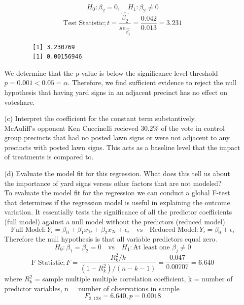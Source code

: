 \documentclass[12pt,letterpaper]{article}
\begin{document}
\begin{enumerate}
	
		\begin{equation*}
		H_0: \beta_2 = 0, \quad H_1: \beta_2 \ne 0
	\end{equation*}
	\begin{equation*}
		\text{Test Statistic}; t = \frac{\hat{\beta_2}}{se_{\hat{\beta_2}}} = \frac{0.042}{0.013} = 3.231
	\end{equation*}
	
	\begin{verbatim}
		[1] 3.230769
		[1] 0.00156946
	\end{verbatim}

	
	We determine that the p-value is below the significance level threshold $p = 0.001 < 0.05 = \alpha$. Therefore, we find sufficient evidence to reject the null hypothesis that having yard signs in an adjacent precinct has no effect on voteshare. 
	
	\vspace{2cm}
	\item [(c)] Interpret the coefficient for the constant term substantively. \\
	
	 McAuliff's opponent Ken Cuccinelli recieved 30.2\% of the vote in control group precincts that had no posted lawn signs or were not adjacent to any precincts with posted lawn signs. This acts as a baseline level that the impact of treatments is compared to. 
 
	\vspace{2cm}
	\newpage
	\item [(d)] Evaluate the model fit for this regression.  What does this	tell us about the importance of yard signs versus other factors that are not modeled? \\
	
	
	To evaluate the model fit for the regression we can conduct a global F-test that determines if the regression model is useful in explaining the outcome variation. It essentially tests the significance of all the predictor coefficients (full model) against a null model without the predictors (reduced model)
		\begin{equation*}
		\text{Full Model}: Y_i = \beta_0 + \beta_1 x_{1i} + \beta_2 x_{2i} + \epsilon_i \quad \text{vs}\quad\text{Reduced Model}: Y_i = \beta_0 + \epsilon_i 
	\end{equation*}
	Therefore the null hypothesis is that all variable predictors equal zero.
	\begin{equation*}
		H_0: \beta_1 = \beta_2 = 0 \quad \text{vs}\quad H_1: \text{At least one }\beta_j \ne 0
	\end{equation*}
	\begin{equation*}
		\text{F Statistic}; F = \frac{R^2_k /k}{(1-R^2_k)/(n-k-1)} = \frac{0.047}{0.00707} = 6.640
	\end{equation*}
	where $R^2_k$ = sample multiple multiple correlation coefficient, k = number of predictor variables, n = number of observations in sample
	\begin{equation*}
	 	F_{2,128} = 6.640, p = 0.0018
	\end{equation*}
	

\end{enumerate}
\end{document}
